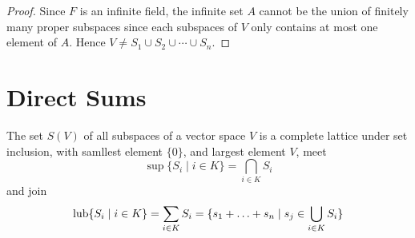 \begin{proof}
Since $F$ is an infinite field, the infinite set $A$ cannot be the union of finitely many proper subspaces since each subspaces of $V$ only contains at most one element of $A$. Hence $V\neq S_1\cup S_2\cup\cdots\cup S_n$.
\end{proof}

\section{Direct Sums}

\begin{theorem}
The set $S(V)$ of all subspaces of a vector space $V$ is a complete lattice under set inclusion, with samllest element $\{0\}$, and largest element $V$, meet 
\[
	\sup\{S_i\mid i\in K\}=\bigcap_{i\in K} S_i
\]
and join
\[	
	\operatorname{lub}\{S_i\mid i\in K\}=\sum_{i\in K} S_i = \{s_1+\ldots+s_n\mid s_j\in\bigcup_{i\in K} S_i\}
\]
\end{theorem}

